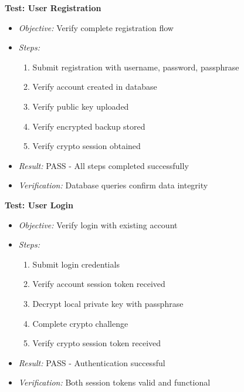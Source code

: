 \textbf{Test: User Registration}
\begin{itemize}
    \item \textit{Objective:} Verify complete registration flow
    \item \textit{Steps:}
    \begin{enumerate}
        \item Submit registration with username, password, passphrase
        \item Verify account created in database
        \item Verify public key uploaded
        \item Verify encrypted backup stored
        \item Verify crypto session obtained
    \end{enumerate}
    \item \textit{Result:} PASS - All steps completed successfully
    \item \textit{Verification:} Database queries confirm data integrity
\end{itemize}

\textbf{Test: User Login}
\begin{itemize}
    \item \textit{Objective:} Verify login with existing account
    \item \textit{Steps:}
    \begin{enumerate}
        \item Submit login credentials
        \item Verify account session token received
        \item Decrypt local private key with passphrase
        \item Complete crypto challenge
        \item Verify crypto session token received
    \end{enumerate}
    \item \textit{Result:} PASS - Authentication successful
    \item \textit{Verification:} Both session tokens valid and functional
\end{itemize}


